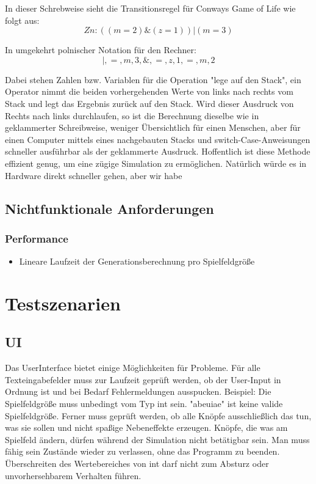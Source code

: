 \documentclass[11pt,a4paper]{article}
\begin{document}
\par
In dieser Schrebweise sieht die Transitionsregel für Conways Game of Life wie folgt aus:
\[Zn : ((m=2)\&(z=1))|(m=3) \]
\par
In umgekehrt polnischer Notation für den Rechner:
\[|,=,m,3,\&,=,z,1,=,m,2\]
\par
Dabei stehen Zahlen bzw. Variablen für die Operation "lege auf den Stack", ein Operator nimmt die beiden vorhergehenden Werte von links nach rechts vom Stack und legt das Ergebnis zurück auf den Stack.
Wird dieser Ausdruck von Rechts nach links durchlaufen, so ist die Berechnung dieselbe wie in geklammerter Schreibweise, weniger Übersichtlich für einen Menschen, aber für einen Computer mittels eines nachgebauten Stacks und switch-Case-Anweisungen schneller ausführbar als der geklammerte Ausdruck. Hoffentlich ist diese Methode effizient genug, um eine zügige Simulation zu ermöglichen. Natürlich würde es in Hardware direkt schneller gehen, aber wir habe

 
\subsection{Nichtfunktionale Anforderungen}
\subsubsection{Performance}
\begin{itemize}
    \item Lineare Laufzeit der Generationsberechnung pro Spielfeldgröße
\end{itemize}

\pagebreak

\section{Testszenarien}
\subsection{UI}

Das UserInterface bietet einige Möglichkeiten für Probleme. Für alle Texteingabefelder muss zur Laufzeit geprüft werden, ob der User-Input in Ordnung ist und bei Bedarf Fehlermeldungen ausspucken. Beispiel: Die Spielfeldgröße muss unbedingt vom Typ int sein. "abeuiae" ist keine valide Spielfeldgröße.
Ferner muss geprüft werden, ob alle Knöpfe ausschließlich das tun, was sie sollen und nicht spaßige Nebeneffekte erzeugen.
Knöpfe, die was am Spielfeld ändern, dürfen während der Simulation nicht betätigbar sein. Man muss fähig sein Zustände wieder zu verlassen, ohne das Programm zu beenden. Überschreiten des Wertebereiches von int darf nicht zum Absturz oder unvorhersehbarem Verhalten führen. 
\end{document}
